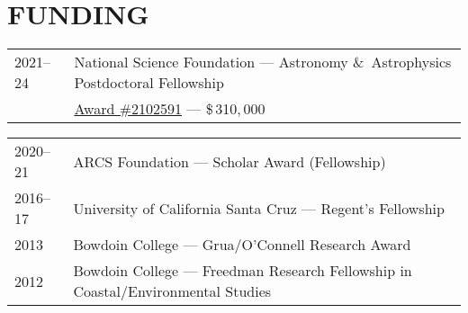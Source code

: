 \section*{FUNDING}
\begin{tabular}{@{}p{.1\linewidth} @{}p{.9\linewidth}} 
2021--24 & National Science Foundation --- Astronomy \&\ Astrophysics Postdoctoral Fellowship\\
& \href{https://www.nsf.gov/awardsearch/showAward?AWD_ID=2102591}{Award \#2102591} --- \$\,310,\,000
\end{tabular}

\begin{tabular}{@{}p{.1\linewidth} @{}p{.9\linewidth}} 
    2020--21 & ARCS Foundation --- Scholar Award (Fellowship) \\
2016--17 & University of California Santa Cruz  --- Regent's Fellowship \\
2013 & Bowdoin College --- Grua/O'Connell Research Award  \\ 
2012 & Bowdoin College --- Freedman Research Fellowship in Coastal/Environmental Studies \\
\end{tabular}